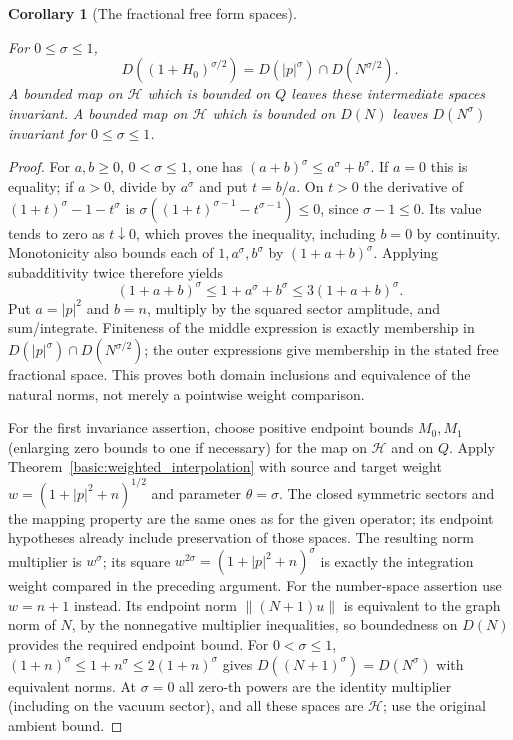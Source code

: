 \documentclass[11pt,a4paper]{article}
\newtheorem{corollary}[theorem]{Corollary}
\theoremstyle{definition}
\theoremstyle{remark}
\newcommand{\proofid}[1]{\par\smallskip{\normalfont\scriptsize\color{inkblue}Stable ID: \nolinkurl{#1}}\par\smallskip}
\begin{document}
\begin{corollary}[The fractional free form spaces]
\label{basic:fractional-free}
\proofid{basic:fractional-free}
\par{}\par\smallskip

For $0\leq\sigma\leq1$,
\[
 D((1+H_0)^{\sigma/2})
 =D(|p|^\sigma)\cap D(N^{\sigma/2}).
\]
A bounded map on $\mathcal H$ which is bounded on $Q$ leaves these
intermediate spaces invariant. A bounded map on $\mathcal H$ which is
bounded on $D(N)$ leaves $D(N^\sigma)$ invariant for $0\leq\sigma\leq1$.
\end{corollary}
\begin{proof}
For $a,b\geq0$, $0<\sigma\leq1$, one has
$(a+b)^\sigma\leq a^\sigma+b^\sigma$. If $a=0$ this is equality;
if $a>0$, divide by $a^\sigma$ and put $t=b/a$. On $t>0$ the
derivative of $(1+t)^\sigma-1-t^\sigma$ is
$\sigma((1+t)^{\sigma-1}-t^{\sigma-1})\leq0$, since
$\sigma-1\leq0$. Its value tends to zero as $t\downarrow0$,
which proves the inequality, including $b=0$ by continuity.
Monotonicity also bounds each of $1,a^\sigma,b^\sigma$ by
$(1+a+b)^\sigma$. Applying subadditivity twice therefore yields
\[
 (1+a+b)^\sigma\leq 1+a^\sigma+b^\sigma
                 \leq3(1+a+b)^\sigma.
\]
Put $a=|p|^2$ and $b=n$, multiply by the squared sector amplitude,
and sum/integrate. Finiteness of the middle expression is exactly
membership in $D(|p|^\sigma)\cap D(N^{\sigma/2})$; the outer
expressions give membership in the stated free fractional space.
This proves both domain inclusions and equivalence of the natural
norms, not merely a pointwise weight comparison.

For the first invariance assertion, choose positive endpoint bounds
$M_0,M_1$ (enlarging zero bounds to one if necessary) for the map on
$\mathcal H$ and on $Q$. Apply
Theorem~\ref{basic:weighted_interpolation} with source and target
weight $w=(1+|p|^2+n)^{1/2}$ and parameter $\theta=\sigma$.
The closed symmetric sectors and the mapping property are the same
ones as for the given operator; its endpoint hypotheses already
include preservation of those spaces. The resulting norm multiplier is
$w^\sigma$; its square $w^{2\sigma}=(1+|p|^2+n)^\sigma$
is exactly the integration weight compared in the preceding argument.
For the number-space assertion use $w=n+1$ instead. Its endpoint
norm $\|(N+1)u\|$ is equivalent to the graph norm of $N$, by the
nonnegative multiplier inequalities, so boundedness on $D(N)$
provides the required endpoint bound. For $0<\sigma\leq1$,
$(1+n)^\sigma\leq1+n^\sigma\leq2(1+n)^\sigma$ gives
$D((N+1)^\sigma)=D(N^\sigma)$ with equivalent norms.
At $\sigma=0$ all zero-th powers are the identity multiplier
(including on the vacuum sector), and all these spaces are
$\mathcal H$; use the original ambient bound.
\end{proof}
\end{document}
